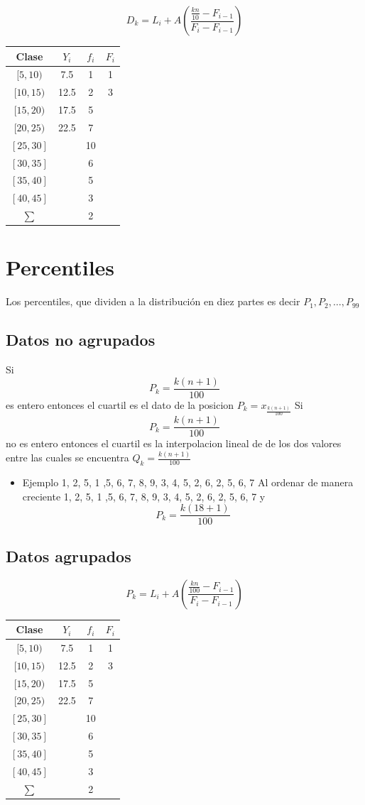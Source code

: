 \documentclass[10pt,]{krantz}
\providecommand{\tightlist}{%
  \setlength{\itemsep}{0pt}\setlength{\parskip}{0pt}}
\theoremstyle{definition}
\theoremstyle{definition}
\theoremstyle{definition}
\theoremstyle{definition}
\theoremstyle{remark}
\begin{document}
\[D_k=L_i+ A\left(\frac{\frac{kn}{10}-F_{i-1}}{F_i-F_{i-1}}\right)\]

\begin{longtable}[]{@{}cccc@{}}
\toprule
Clase & \(Y_i\) & \(f_i\) & \(F_i\)\tabularnewline
\midrule
\endhead
\([5,10)\) & 7.5 & 1 & 1\tabularnewline
\([10,15)\) & 12.5 & 2 & 3\tabularnewline
\([15,20)\) & 17.5 & 5 &\tabularnewline
\([20,25)\) & 22.5 & 7 &\tabularnewline
\([25,30]\) & & 10 &\tabularnewline
\([30,35]\) & & 6 &\tabularnewline
\([35,40]\) & & 5 &\tabularnewline
\([40,45]\) & & 3 &\tabularnewline
\(\sum\) & & 2 &\tabularnewline
\bottomrule
\end{longtable}

\hypertarget{percentiles}{%
\section{Percentiles}\label{percentiles}}

Los percentiles, que dividen a la distribución en diez partes es decir \(P_1, P_2,\ldots, P_{99}\)

\hypertarget{datos-no-agrupados-2}{%
\subsection{Datos no agrupados}\label{datos-no-agrupados-2}}

Si \[P_k=\frac{k(n+1)}{100}\] es entero entonces el cuartil es el dato de la posicion \(P_k=x_\frac{k(n+1)}{100}\)
Si \[P_k=\frac{k(n+1)}{100}\] no es entero entonces el cuartil es la interpolacion lineal de de los dos valores entre las cuales se encuentra \(Q_k=\frac{k(n+1)}{100}\)

\begin{itemize}
\tightlist
\item
  Ejemplo
  1, 2, 5, 1 ,5, 6, 7, 8, 9, 3, 4, 5, 2, 6, 2, 5, 6, 7
  Al ordenar de manera creciente
  1, 2, 5, 1 ,5, 6, 7, 8, 9, 3, 4, 5, 2, 6, 2, 5, 6, 7
  y
  \[P_k=\frac{k(18+1)}{100}\]
\end{itemize}

\hypertarget{datos-agrupados-2}{%
\subsection{Datos agrupados}\label{datos-agrupados-2}}

\[P_k=L_i+ A\left(\frac{\frac{kn}{100}-F_{i-1}}{F_i-F_{i-1}}\right)\]

\begin{longtable}[]{@{}cccc@{}}
\toprule
Clase & \(Y_i\) & \(f_i\) & \(F_i\)\tabularnewline
\midrule
\endhead
\([5,10)\) & 7.5 & 1 & 1\tabularnewline
\([10,15)\) & 12.5 & 2 & 3\tabularnewline
\([15,20)\) & 17.5 & 5 &\tabularnewline
\([20,25)\) & 22.5 & 7 &\tabularnewline
\([25,30]\) & & 10 &\tabularnewline
\([30,35]\) & & 6 &\tabularnewline
\([35,40]\) & & 5 &\tabularnewline
\([40,45]\) & & 3 &\tabularnewline
\(\sum\) & & 2 &\tabularnewline
\bottomrule
\end{longtable}
\end{document}
